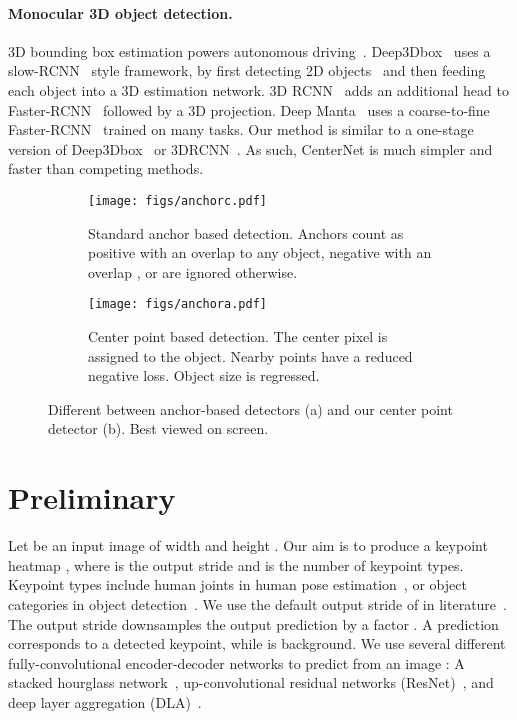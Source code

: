 \documentclass[10pt,twocolumn,letterpaper]{article}
\begin{document}
\paragraph{Monocular 3D object detection.}
3D bounding box estimation powers autonomous driving~\cite{Geiger2012CVPR}.
Deep3Dbox~\cite{mousavian20173d} uses a slow-RCNN~\cite{girshick2014rich} style framework, by first detecting 2D objects~\cite{ren2015faster} and then feeding each object into a 3D estimation network.
3D RCNN~\cite{3DRCNN_CVPR18} adds an additional head to Faster-RCNN~\cite{ren2015faster} followed by a 3D projection.
Deep Manta~\cite{chabot2017deep} uses a coarse-to-fine Faster-RCNN~\cite{ren2015faster} trained on many tasks.
Our method is similar to a one-stage version of Deep3Dbox~\cite{mousavian20173d} or 3DRCNN~\cite{3DRCNN_CVPR18}.
As such, CenterNet is much simpler and faster than competing methods.

\begin{figure}[t]
\begin{subfigure}[t]{0.53\linewidth}
  \centering
   \texttt{[image: figs/anchorc.pdf]}
   \caption{Standard anchor based detection. Anchors count as \textcolor{chameleon3}{positive} with an overlap  to any \textcolor{skyblue3}{object}, \textcolor{scarletred3}{negative} with an overlap , or are \textcolor{aluminium3}{ignored} otherwise.}
\end{subfigure}
\hspace{1mm}
\begin{subfigure}[t]{0.43\linewidth}
  \centering
   \texttt{[image: figs/anchora.pdf]}
   \caption{Center point based detection. The \textcolor{chameleon3}{center pixel} is assigned to the \textcolor{skyblue3}{object}. Nearby points have a reduced negative loss. Object size is regressed.}
\end{subfigure}
   \caption{Different between anchor-based detectors (a) and our center point detector (b). Best viewed on screen.}
\label{fig:anchor}
\end{figure}

\section{Preliminary}
\label{sec:prelim}
Let  be an input image of width  and height .
Our aim is to produce a keypoint heatmap , where  is the output stride and  is the number of keypoint types.
Keypoint types include  human joints in human pose estimation~\cite{cao2017realtime,xiao2018simple}, or  object categories in object detection~\cite{Law_2018_ECCV,zhou2019bottomup}.
We use the default output stride of  in literature~\cite{newell2016stacked,cao2017realtime,papandreou2017towards}.
The output stride downsamples the output prediction by a factor .
A prediction  corresponds to a detected keypoint, while  is background.
We use several different fully-convolutional encoder-decoder networks to predict  from an image : A stacked hourglass network~\cite{newell2016stacked,Law_2018_ECCV}, up-convolutional residual networks (ResNet)~\cite{he2016deep,xiao2018simple}, and deep layer aggregation (DLA)~\cite{yu2018deep}.
\end{document}
